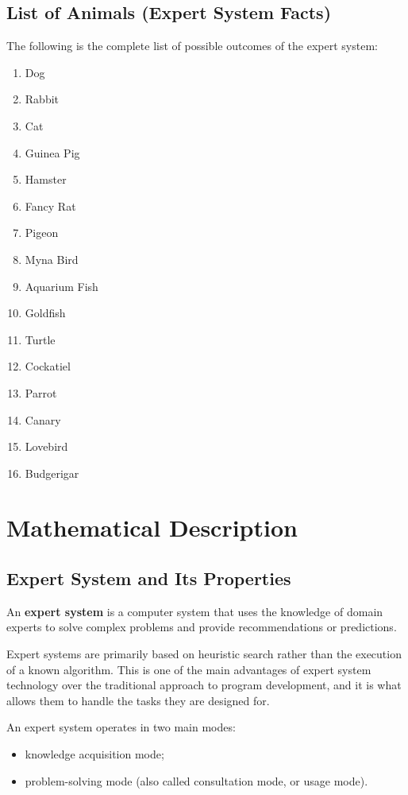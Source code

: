 \documentclass[a4paper,final]{article}
\begin{document}
\subsection*{List of Animals (Expert System Facts)}

The following is the complete list of possible outcomes of the expert system:

\begin{enumerate}
	\item Dog
	\item Rabbit
	\item Cat
	\item Guinea Pig
	\item Hamster
	\item Fancy Rat
	\item Pigeon
	\item Myna Bird
	\item Aquarium Fish
	\item Goldfish
	\item Turtle
	\item Cockatiel
	\item Parrot
	\item Canary
	\item Lovebird
	\item Budgerigar
\end{enumerate}


\newpage
\section{Mathematical Description}

\subsection{Expert System and Its Properties}

An \textbf{expert system} is a computer system that uses the knowledge of domain experts to solve complex problems and provide recommendations or predictions.

Expert systems are primarily based on heuristic search rather than the execution of a known algorithm. This is one of the main advantages of expert system technology over the traditional approach to program development, and it is what allows them to handle the tasks they are designed for.

An expert system operates in two main modes:
\begin{itemize}
	\item knowledge acquisition mode;
	\item problem-solving mode (also called consultation mode, or usage mode).
\end{itemize}
\end{document}
